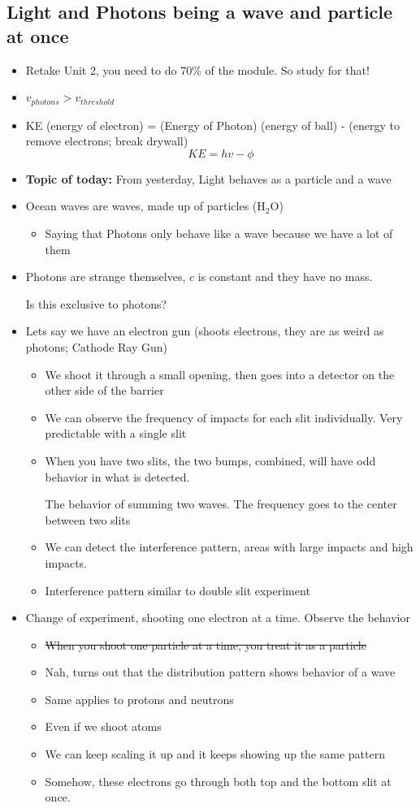 \documentclass{article}
\begin{document}
\subsection{Light and Photons being a wave and particle at once}
\begin{itemize}
  \item Retake Unit 2, you need to do 70\% of the module. So study for that!
  \item $v_{photons} > v_{threshold} $
  \item KE (energy of electron) = (Energy of Photon) (energy of ball) - (energy to remove electrons; break drywall)
    $$ KE = hv - \phi{} $$
  \item \textbf{Topic of today:} From yesterday, Light behaves as a particle and a wave
  \item Ocean waves are waves, made up of particles (H$_2$O)
    \begin{itemize}
      \item Saying that Photons only behave like a wave because we have a lot of them
    \end{itemize}
  \item Photons are strange themselves, $c$ is constant and they have no mass.

    Is this exclusive to photons?
  \item Lets say we have an electron gun (shoots electrons, they are as weird as photons; Cathode Ray Gun)
    \begin{itemize}
      \item We shoot it through a small opening, then goes into a detector on the other side of the barrier
      \item We can observe the frequency of impacts for each slit individually. Very predictable with a single slit
      \item When you have two slits, the two bumps, combined, will have odd behavior in what is detected.

        The behavior of summing two waves. The frequency goes to the center between two slits
      \item We can detect the interference pattern, areas with large impacts and high impacts.
      \item Interference pattern similar to double slit experiment
    \end{itemize}
  \item Change of experiment, shooting one electron at a time.
    Observe the behavior
    \begin{itemize}
      \item \st{When you shoot one particle at a time, you treat it as a particle}
      \item Nah, turns out that the distribution pattern shows behavior of a wave
      \item Same applies to protons and neutrons
      \item Even if we shoot atoms
      \item We can keep scaling it up and it keeps showing up the same pattern
      \item Somehow, these electrons go through both top and the bottom slit at once.


\end{itemize}
\end{itemize}
\end{document}
